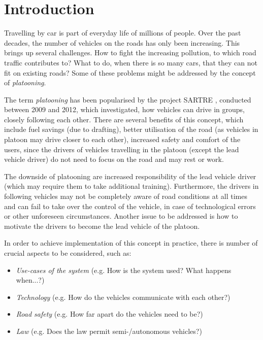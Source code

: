 \section{Introduction}
% 
Travelling by car is part of everyday life of millions of people. Over the past decades, the number of vehicles on the roads has only been increasing\footnotemark. This brings up several challenges. How to fight the increasing pollution, to which road traffic contributes to? What to do, when there is so many cars, that they can not fit on existing roads? Some of these problems might be addressed by the concept of \emph{platooning}.\par
% 
% 
The term \emph{platooning} has been popularised by the project SARTRE \cite{Chan2012ProjectSARTRE}, conducted between 2009 and 2012, which investigated, how vehicles can drive in groups, closely following each other. There are several benefits of this concept, which include fuel savings (due to drafting\footnotemark[1]), better utilisation of the road (as vehicles in platoon may drive closer to each other), increased safety and comfort of the users, since the drivers of vehicles travelling in the platoon (except the lead vehicle driver) do not need to focus on the road and may rest or work.\par
% 
The downside of platooning are increased responsibility of the lead vehicle driver (which may require them to take additional training). Furthermore, the drivers in following vehicles may not be completely aware of road conditions at all times and can fail to take over the control of the vehicle, in case of technological errors or other unforeseen circumstances. Another issue to be addressed is how to motivate the drivers to become the lead vehicle of the platoon.\par
% 
In order to achieve implementation of this concept in practice, there is number of crucial aspects to be considered, such as:
\begin{itemize}[noitemsep]
    \item \emph{Use-cases of the system} (e.g. How is the system used? What happens when...?)
    \item \emph{Technology} (e.g. How do the vehicles communicate with each other?)
    \item \emph{Road safety} (e.g. How far apart do the vehicles need to be?)
    \item \emph{Law} (e.g. Does the law permit semi-/autonomous vehicles?)
\end{itemize} \par

